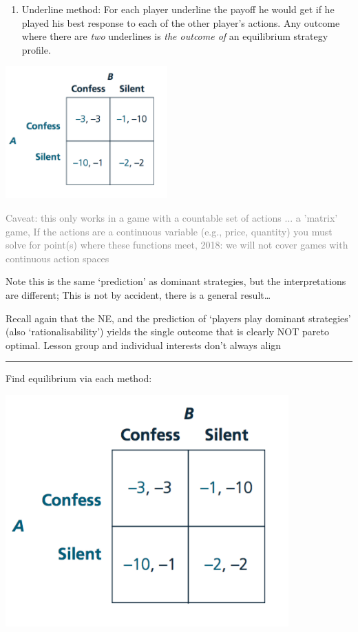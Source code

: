 \documentclass[]{article}
\providecommand{\tightlist}{%
  \setlength{\itemsep}{0pt}\setlength{\parskip}{0pt}}
\begin{document}
\bigskip

\begin{enumerate}
\def\labelenumi{\arabic{enumi}.}
\setcounter{enumi}{1}
\tightlist
\item
  Underline method: For each player underline the payoff he would get if he played his best response to each of the other player's actions. Any outcome where there are \emph{two} underlines is \emph{the outcome of} an equilibrium strategy profile.
\end{enumerate}

\includegraphics[height=2in]{picsfigs/pd_normal.png}

\textcolor{gray}{Caveat: this only works in a game with a countable set of actions ... a 'matrix' game,
If the actions are a continuous variable (e.g., price, quantity) you must solve for point(s) where these functions meet,
2018: we will not cover games with continuous action spaces}

Note this is the same `prediction' as dominant strategies, but the interpretations are different;
This is not by accident, there is a general result\ldots{}

Recall again that the NE, and the prediction of `players play dominant strategies' (also `rationalisability')
yields the single outcome that is clearly NOT pareto optimal. Lesson group and individual interests don't always align

\begin{center}\rule{0.5\linewidth}{\linethickness}\end{center}

Find equilibrium via each method:

\includegraphics[height=3.5in]{picsfigs/pd_normal.png}
\end{document}

